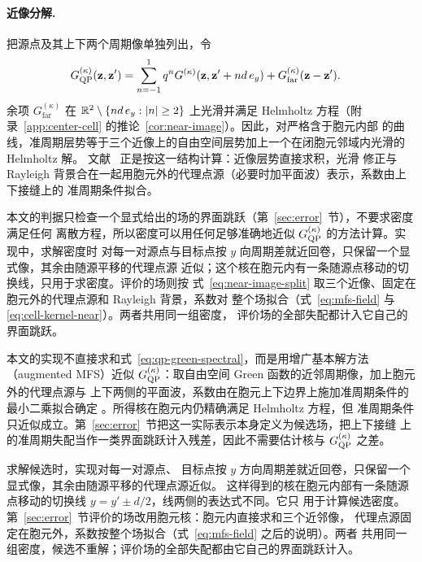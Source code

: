 \paragraph{近像分解.}
把源点及其上下两个周期像单独列出，令
\begin{align}
  G^{(\kappa)}_{\mathrm{QP}}(\mathbf z,\mathbf z')
  &=\sum_{n=-1}^{1}q^nG^{(\kappa)}(\mathbf z,\mathbf z'+nd\,e_y)
    +G^{(\kappa)}_{\mathrm{far}}(\mathbf z-\mathbf z').
  \label{eq:near-image-split}
\end{align}
余项 $G^{(\kappa)}_{\mathrm{far}}$ 在 $\mathbb{R}^2\setminus\{nd\,e_y:|n|\geq2\}$ 上光滑并满足
Helmholtz 方程（附录~\ref{app:center-cell} 的推论~\ref{cor:near-image}）。因此，对严格含于胞元内部
的曲线，准周期层势等于三个近像上的自由空间层势加上一个在闭胞元邻域内光滑的 Helmholtz 解。
文献~\cite{BarnettGreengard2010,ChoBarnett2015} 正是按这一结构计算：近像层势直接求积，光滑
修正与 Rayleigh 背景合在一起用胞元外的代理点源（必要时加平面波）表示，系数由上下接缝上的
准周期条件拟合。

本文的判据只检查一个显式给出的场的界面跳跃（第~\ref{sec:error}~节），不要求密度满足任何
离散方程，所以密度可以用任何足够准确地近似 $G^{(\kappa)}_{\mathrm{QP}}$ 的方法计算。实现中，求解密度时
对每一对源点与目标点按 $y$ 向周期差就近回卷，只保留一个显式像，其余由随源平移的代理点源
近似；这个核在胞元内有一条随源点移动的切换线，只用于求密度。评价的场则按
式~\eqref{eq:near-image-split} 取三个近像、固定在胞元外的代理点源和 Rayleigh 背景，系数对
整个场拟合（式~\eqref{eq:mfs-field} 与 \eqref{eq:cell-kernel-near}）。两者共用同一组密度，
评价场的全部失配都计入它自己的界面跳跃。

\begin{workonly}
本文的实现不直接求和式~\eqref{eq:qp-green-spectral}，而是用增广基本解方法（augmented
MFS）近似 $G^{(\kappa)}_{\mathrm{QP}}$：取自由空间 Green 函数的近邻周期像，加上胞元外的代理点源与
上下两侧的平面波，系数由在胞元上下边界上施加准周期条件的最小二乘拟合确定
\cite{BarnettGreengard2010,ChoBarnett2015}。所得核在胞元内仍精确满足 Helmholtz 方程，但
准周期条件只近似成立。第~\ref{sec:error}~节把这一实际表示本身定义为候选场，把上下接缝
上的准周期失配当作一类界面跳跃计入残差，因此不需要估计核与 $G^{(\kappa)}_{\mathrm{QP}}$ 之差。

求解候选时，实现对每一对源点、
目标点按 $y$ 方向周期差就近回卷，只保留一个显式像，其余由随源平移的代理点源近似。
这样得到的核在胞元内部有一条随源点移动的切换线 $y=y'\pm d/2$，线两侧的表达式不同。它只
用于计算候选密度。第~\ref{sec:error}~节评价的场改用胞元核：胞元内直接求和三个近邻像，
代理点源固定在胞元外，系数按整个场拟合（式~\eqref{eq:mfs-field} 之后的说明）。两者
共用同一组密度，候选不重解；评价场的全部失配都由它自己的界面跳跃计入。
\end{workonly}

